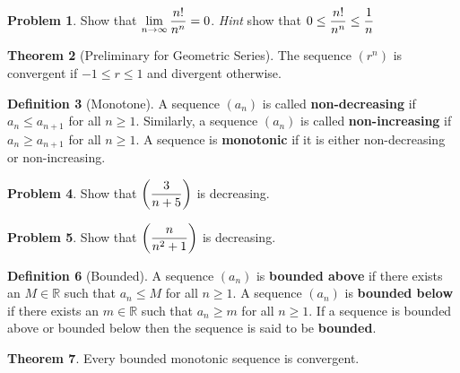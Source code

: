 \documentclass[letterpaper, twoside, 12pt]{book}
\theoremstyle{definition}
\newtheorem{theorem}{Theorem}
\theoremstyle{definition}
\newtheorem{definition}[theorem]{Definition}
\newtheorem{problem}[theorem]{Problem}
\newcommand{\ds}{\ensuremath{\displaystyle}}
\begin{document}
\vfill

\newpage

\begin{problem}
 Show that $\ds \lim_{n \rightarrow \infty} \frac{n!}{n^n} = 0$.  \emph{Hint} show that $\ds 0 \leq \frac{n!}{n^n} \leq \frac{1}{n}$
\end{problem}

\vfill

\begin{theorem}[Preliminary for Geometric Series]
 The sequence $\left(r^n\right)$ is convergent if $-1 \leq r \leq 1$ and divergent otherwise.
\end{theorem}

\begin{definition}[Monotone]
 A sequence $\left(a_n\right)$ is called \textbf{non-decreasing} if $a_n \leq a_{n+1}$ for all $n \geq 1$.  Similarly, a sequence $\left(a_n\right)$ is called \textbf{non-increasing} if $a_n \geq a_{n+1}$ for all $n \geq 1$.  A sequence is \textbf{monotonic} if it is either non-decreasing or non-increasing.
\end{definition}

\begin{problem}
 Show that $\ds \left( \frac{3}{n+5} \right)$ is decreasing.
\end{problem}

\vfill

\newpage

\begin{problem}
 Show that $\ds \left( \frac{n}{n^2+1} \right)$ is decreasing.
\end{problem}

\vfill

\begin{definition}[Bounded]
 A sequence $\left( a_n \right)$ is \textbf{bounded above} if there exists an $M \in \mathbb{R}$ such that $a_n \leq M$ for all $n \geq 1$.  A sequence $\left( a_n \right)$ is \textbf{bounded below} if there exists an $m \in \mathbb{R}$ such that $a_n \geq m$ for all $n \geq 1$.  If a sequence is bounded above or bounded below then the sequence is said to be \textbf{bounded}.
\end{definition}


\begin{theorem}
 Every bounded monotonic sequence is convergent.
\end{theorem}
\end{document}
